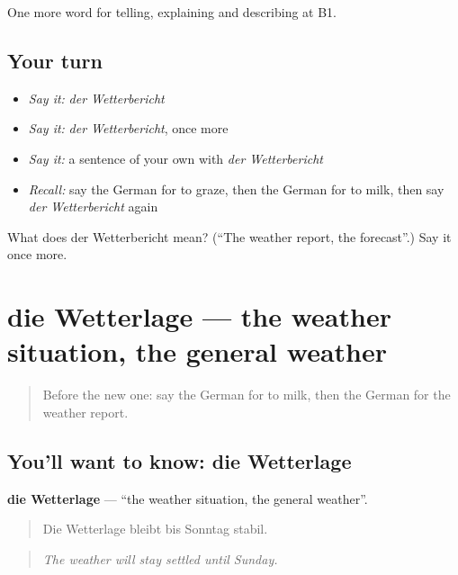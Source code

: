 \begin{grammarlens}[title={What you've built}]
One more word for telling, explaining and describing at B1.
\end{grammarlens}

\subsection*{Your turn}
\begin{itemize}
\raggedright
  \item \emph{Say it:} \emph{der Wetterbericht}
  \item \emph{Say it:} \emph{der Wetterbericht}, once more
  \item \emph{Say it:} a sentence of your own with \emph{der Wetterbericht}
  \item \emph{Recall:} say the German for to graze, then the German for to milk, then say \emph{der Wetterbericht} again
\end{itemize}

\begin{tcolorbox}[breakable,colback=teal!4,colframe=teal!35!black,title={Before you move on}]
What does der Wetterbericht mean? (\textquotedblleft{}The weather report, the forecast\textquotedblright{}.) Say it once more.
\end{tcolorbox}
\section[die Wetterlage]{die Wetterlage — the weather situation, the general weather}

\label{lesson:GE-C460-wetterlage}



\begin{quote}
Before the new one: say the German for to milk, then the German for the weather report.
\end{quote}

\subsection*{You'll want to know: die Wetterlage}
\textbf{die Wetterlage} — \textquotedblleft{}the weather situation, the general weather\textquotedblright{}.

\begin{quote}
Die Wetterlage bleibt bis Sonntag stabil.
\end{quote}

\begin{quote}
\emph{The weather will stay settled until Sunday.}
\end{quote}

